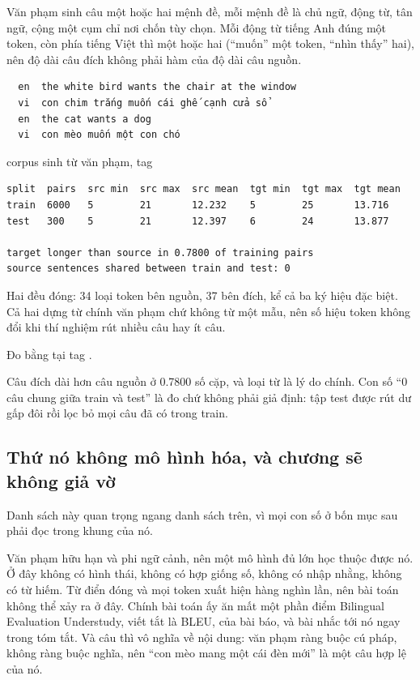 Văn phạm sinh câu một hoặc hai mệnh đề, mỗi mệnh đề là chủ ngữ, động từ, tân
ngữ, cộng một cụm chỉ nơi chốn tùy chọn. Mỗi động từ tiếng Anh đúng một token,
còn phía tiếng Việt thì một hoặc hai (\enquote{muốn} một token,
\enquote{nhìn thấy} hai), nên độ dài câu đích không phải hàm của độ dài câu
nguồn.

\begin{verbatim}
  en  the white bird wants the chair at the window
  vi  con chim trắng muốn cái ghế cạnh cửa sổ
  en  the cat wants a dog
  vi  con mèo muốn một con chó
\end{verbatim}

\begin{measured}{corpus sinh từ văn phạm, tag }
\begin{verbatim}
split  pairs  src min  src max  src mean  tgt min  tgt max  tgt mean
train  6000   5        21       12.232    5        25       13.716
test   300    5        21       12.397    6        24       13.877

target longer than source in 0.7800 of training pairs
source sentences shared between train and test: 0
\end{verbatim}

Hai  đều đóng: 34 loại token bên nguồn, 37 bên đích, kể
cả ba ký hiệu đặc biệt. Cả hai dựng từ chính văn phạm chứ không từ một mẫu, nên
số hiệu token không đổi khi thí nghiệm rút nhiều câu hay ít câu.

Đo bằng  tại tag .
\end{measured}

Câu đích dài hơn câu nguồn ở 0.7800 số cặp, và loại từ là lý do chính. Con số
\enquote{0 câu chung giữa train và test} là đo chứ không phải giả định: tập test
được rút dư gấp đôi rồi lọc bỏ mọi câu đã có trong train.

\subsection*{Thứ nó không mô hình hóa, và chương sẽ không giả vờ}

%
Danh sách này quan trọng ngang danh sách trên, vì mọi con số ở bốn mục sau phải
đọc trong khung của nó.

Văn phạm hữu hạn và phi ngữ cảnh, nên một mô hình đủ lớn học thuộc được nó. Ở
đây không có hình thái, không có hợp giống số, không có nhập nhằng, không có từ
hiếm. Từ điển đóng và mọi token xuất hiện hàng nghìn lần, nên bài toán
 không thể xảy ra ở đây. Chính bài toán ấy
ăn mất một phần điểm Bilingual Evaluation Understudy, viết tắt là BLEU, của bài
báo, và bài nhắc tới nó ngay trong tóm tắt. Và câu
thì vô nghĩa về nội dung: văn phạm ràng buộc cú pháp, không ràng buộc nghĩa, nên
\enquote{con mèo mang một cái đèn mới} là một câu hợp lệ của nó.

